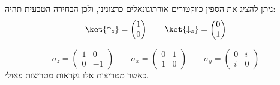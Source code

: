 \documentclass{tstextbook}
\begin{document}
\begin{proposition}
ניתן להציג את הספין כווקטורים אורתוגונאלים כרצונינו, ולכן הבחירה הטבעית תהיה:
$$\ket{\uparrow_{z}} =\begin{pmatrix}1 \\ 0\end{pmatrix}\qquad  \ket{\downarrow_{z}} =\begin{pmatrix}0 \\ 1
\end{pmatrix}$$

\end{proposition}
\begin{proposition}
$$\sigma_{z}=\begin{pmatrix}1 & 0 \\0 & -1\end{pmatrix}\qquad \sigma_{x}=\begin{pmatrix}0 & 1 \\1 & 0\end{pmatrix}\qquad \sigma_{y}=\begin{pmatrix}0 & i \\i & 0
\end{pmatrix}$$
כאשר מטריצות אלו נקראות מטריצות פאולי.

\end{proposition}
\end{document}
